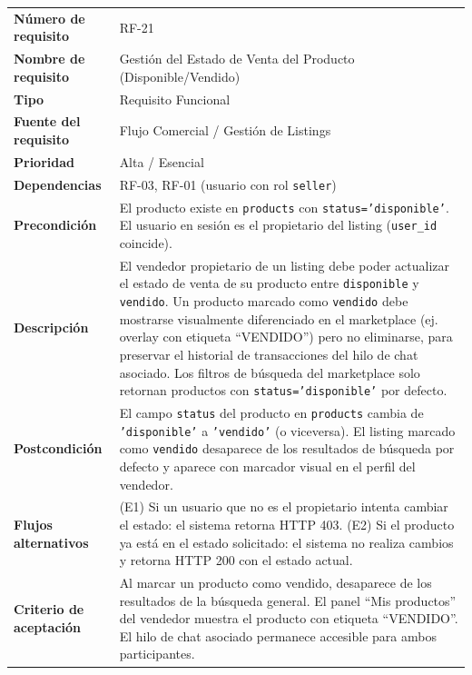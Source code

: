 \documentclass[11pt,a4paper]{report}
\begin{document}
\begin{table}[H]
\centering
\begin{tabularx}{\textwidth}{|l|L|}
\hline
{} \\ \hline
\textbf{Número de requisito} & RF-21 \\ \hline
\textbf{Nombre de requisito} & Gestión del Estado de Venta del Producto (Disponible/Vendido) \\ \hline
\textbf{Tipo} & Requisito Funcional \\ \hline
\textbf{Fuente del requisito} & Flujo Comercial / Gestión de Listings \\ \hline
\textbf{Prioridad} & Alta / Esencial \\ \hline
\textbf{Dependencias} & RF-03, RF-01 (usuario con rol \texttt{seller}) \\ \hline
\textbf{Precondición} & El producto existe en \texttt{products} con \texttt{status='disponible'}. El usuario en sesión es el propietario del listing (\texttt{user\_id} coincide). \\ \hline
\textbf{Descripción} & El vendedor propietario de un listing debe poder actualizar el estado de venta de su producto entre \texttt{disponible} y \texttt{vendido}. Un producto marcado como \texttt{vendido} debe mostrarse visualmente diferenciado en el marketplace (ej. overlay con etiqueta ``VENDIDO'') pero no eliminarse, para preservar el historial de transacciones del hilo de chat asociado. Los filtros de búsqueda del marketplace solo retornan productos con \texttt{status='disponible'} por defecto. \\ \hline
\textbf{Postcondición} & El campo \texttt{status} del producto en \texttt{products} cambia de \texttt{'disponible'} a \texttt{'vendido'} (o viceversa). El listing marcado como \texttt{vendido} desaparece de los resultados de búsqueda por defecto y aparece con marcador visual en el perfil del vendedor. \\ \hline
\textbf{Flujos alternativos} & (E1) Si un usuario que no es el propietario intenta cambiar el estado: el sistema retorna HTTP 403. (E2) Si el producto ya está en el estado solicitado: el sistema no realiza cambios y retorna HTTP 200 con el estado actual. \\ \hline
\textbf{Criterio de aceptación} & Al marcar un producto como vendido, desaparece de los resultados de la búsqueda general. El panel ``Mis productos'' del vendedor muestra el producto con etiqueta ``VENDIDO''. El hilo de chat asociado permanece accesible para ambos participantes. \\ \hline
\end{tabularx}
\end{table}
\end{document}
